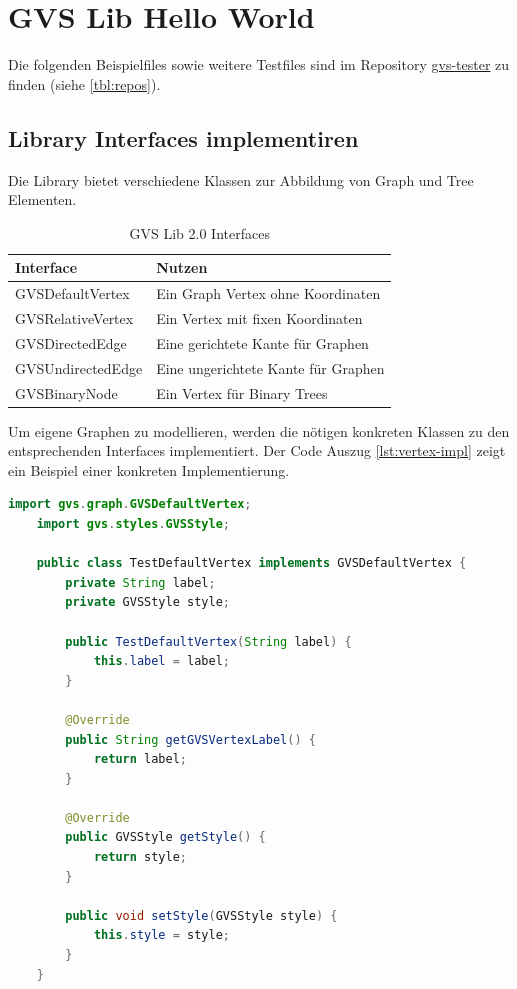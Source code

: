 \documentclass[11pt,a4paper,english,oneside]{book}
\numberwithin{equation}{chapter}
\begin{document}
	\section{GVS Lib Hello World}
	Die folgenden Beispielfiles sowie weitere Testfiles sind im Repository \href{https://github.com/Graphs-Visualization-Service/gvs-tester}{gvs-tester} zu finden (siehe \ref{tbl:repos}).
	
	\subsection{Library Interfaces implementiren}
	Die Library bietet verschiedene Klassen zur Abbildung von Graph und Tree Elementen.
	
	\begin{table}[h!]
	\centering
	\begin{tabularx}{\linewidth}{l l}
		\toprule 
		Interface & Nutzen \\
		\midrule
		GVSDefaultVertex & Ein Graph Vertex ohne Koordinaten \\
		GVSRelativeVertex & Ein Vertex mit fixen Koordinaten \\
		GVSDirectedEdge & Eine gerichtete Kante für Graphen \\
		GVSUndirectedEdge & Eine ungerichtete Kante für Graphen \\
		GVSBinaryNode & Ein Vertex für Binary Trees \\
		\bottomrule 
	\end{tabularx} 
	\caption{GVS Lib 2.0 Interfaces} 
	\label{tbl:Interfaces}
	\end{table}

	Um eigene Graphen zu modellieren, werden die nötigen konkreten Klassen zu den entsprechenden Interfaces implementiert. Der Code Auszug \ref{lst:vertex-impl} zeigt ein Beispiel einer konkreten Implementierung.
	
	\begin{lstlisting}[language=java, frame=single, caption={DefaultVertex Implementierung}, label={lst:vertex-impl}]
	import gvs.graph.GVSDefaultVertex;
	import gvs.styles.GVSStyle;
	
	public class TestDefaultVertex implements GVSDefaultVertex {
		private String label;
		private GVSStyle style;
		
		public TestDefaultVertex(String label) {
			this.label = label;
		}
			
		@Override
		public String getGVSVertexLabel() {
			return label;
		}
		
		@Override
		public GVSStyle getStyle() {
			return style;
		}
		
		public void setStyle(GVSStyle style) {
			this.style = style;
		}
	}
	\end{lstlisting}
	
\end{document}
